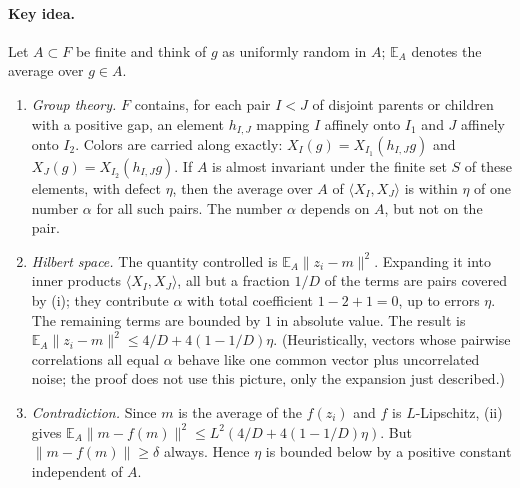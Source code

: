 \documentclass[11pt]{article}
\newcommand{\norm}[1]{\lVert #1\rVert}
\newcommand{\ip}[2]{\langle #1,#2\rangle}
\theoremstyle{definition}
\numberwithin{equation}{section}
\begin{document}
\paragraph{Key idea.}
Let \(A\subset F\) be finite and think of \(g\) as uniformly random in \(A\);
\(\mathbb E_A\) denotes the average over \(g\in A\).
\begin{enumerate}[label=(\roman*)]
\item \emph{Group theory.} \(F\) contains, for each pair \(I<J\) of disjoint
parents or children with a positive gap, an element \(h_{I,J}\) mapping \(I\)
affinely onto \(I_1\) and \(J\) affinely onto \(I_2\). Colors are carried
along exactly: \(X_I(g)=X_{I_1}(h_{I,J}g)\) and \(X_J(g)=X_{I_2}(h_{I,J}g)\).
If \(A\) is almost invariant under the finite set \(S\) of these elements,
with defect \(\eta\), then the average over \(A\) of \(\ip{X_I}{X_J}\) is
within \(\eta\) of one number \(\alpha\) for all such pairs. The number
\(\alpha\) depends on \(A\), but not on the pair.
\item \emph{Hilbert space.} The quantity controlled is
\(\mathbb E_A\norm{z_i-m}^2\). Expanding it into inner products
\(\ip{X_I}{X_J}\), all but a fraction \(1/D\) of the terms are pairs covered
by (i); they contribute \(\alpha\) with total coefficient \(1-2+1=0\), up to
errors \(\eta\). The remaining terms are bounded by \(1\) in absolute value.
The result is
\(\mathbb E_A\norm{z_i-m}^2\le 4/D+4(1-1/D)\eta\).
(Heuristically, vectors whose pairwise correlations all equal \(\alpha\)
behave like one common vector plus uncorrelated noise; the proof does not use
this picture, only the expansion just described.)
\item \emph{Contradiction.} Since \(m\) is the average of the \(f(z_i)\) and
\(f\) is \(L\)-Lipschitz, (ii) gives
\(\mathbb E_A\norm{m-f(m)}^2\le L^2(4/D+4(1-1/D)\eta)\). But
\(\norm{m-f(m)}\ge\delta\) always. Hence \(\eta\) is bounded below by a
positive constant independent of \(A\).
\end{enumerate}
\end{document}
